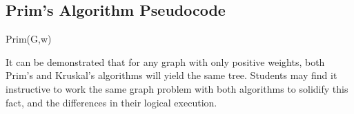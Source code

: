 \documentclass[12pt,letterpaper]{article}
\begin{document}
\subsection{Prim's Algorithm Pseudocode}
\begin{algorithm}[h]
Prim(G,w)
\end{algorithm}
\FloatBarrier
It can be demonstrated that for any graph with only positive weights, both Prim's and Kruskal's algorithms will yield the same tree. Students may find it instructive to work the same graph problem with both algorithms to solidify this fact, and the differences in their logical execution. 
\end{document}
